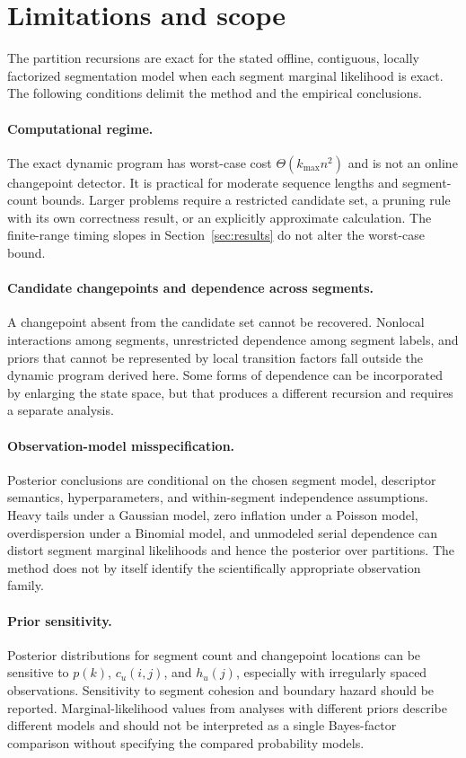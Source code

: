 \section{Limitations and scope}
\label{sec:limitations}

The partition recursions are exact for the stated offline, contiguous, locally factorized segmentation model when each segment marginal likelihood is exact. The following conditions delimit the method and the empirical conclusions.

\paragraph{Computational regime.}
The exact dynamic program has worst-case cost $\Theta(k_{\max}n^2)$ and is not an online changepoint detector. It is practical for moderate sequence lengths and segment-count bounds. Larger problems require a restricted candidate set, a pruning rule with its own correctness result, or an explicitly approximate calculation. The finite-range timing slopes in Section~\ref{sec:results} do not alter the worst-case bound.

\paragraph{Candidate changepoints and dependence across segments.}
A changepoint absent from the candidate set cannot be recovered. Nonlocal interactions among segments, unrestricted dependence among segment labels, and priors that cannot be represented by local transition factors fall outside the dynamic program derived here. Some forms of dependence can be incorporated by enlarging the state space, but that produces a different recursion and requires a separate analysis.

\paragraph{Observation-model misspecification.}
Posterior conclusions are conditional on the chosen segment model, descriptor semantics, hyperparameters, and within-segment independence assumptions. Heavy tails under a Gaussian model, zero inflation under a Poisson model, overdispersion under a Binomial model, and unmodeled serial dependence can distort segment marginal likelihoods and hence the posterior over partitions. The method does not by itself identify the scientifically appropriate observation family.

\paragraph{Prior sensitivity.}
Posterior distributions for segment count and changepoint locations can be sensitive to $p(k)$, $c_u(i,j)$, and $h_u(j)$, especially with irregularly spaced observations. Sensitivity to segment cohesion and boundary hazard should be reported. Marginal-likelihood values from analyses with different priors describe different models and should not be interpreted as a single Bayes-factor comparison without specifying the compared probability models.

